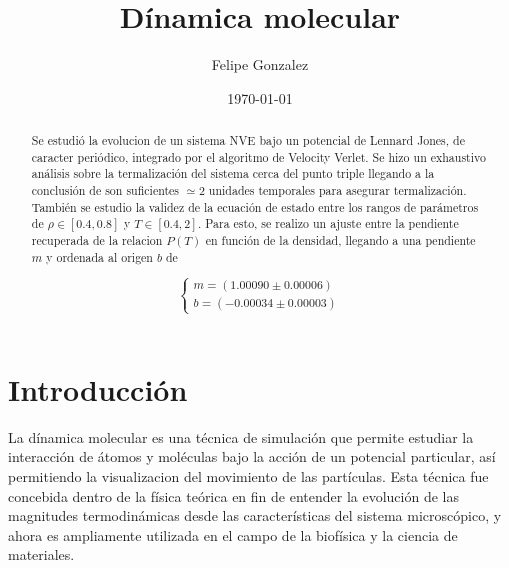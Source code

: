 \documentclass[%
 reprint,
 amsmath,amssymb,
 aps,
]{revtex4-1}
\begin{document}

\title{D\'inamica molecular}

\author{Felipe Gonzalez}


\date{\today}

\begin{abstract}

Se estudi\'o la evolucion de un sistema NVE bajo un potencial de Lennard Jones,
de caracter peri\'odico, integrado por el algoritmo de Velocity Verlet. Se hizo
un exhaustivo an\'alisis sobre la termalizaci\'on del sistema cerca del punto
triple llegando a la conclusi\'on de son suficientes $\simeq 2$ unidades
temporales para asegurar termalizaci\'on. Tambi\'en se estudio la validez de la
ecuaci\'on de estado entre los rangos de par\'ametros de $\rho \in [0.4, 0.8]$
y $T \in [0.4, 2]$. Para esto, se realizo un ajuste entre la pendiente
recuperada de la relacion $P(T)$ en funci\'on de la densidad, llegando a una
pendiente $m$ y ordenada al origen $b$ de

$$
\left \{
  \begin{matrix}
    m = (1.00090 \pm 0.00006) \\
    b = (-0.00034 \pm 0.00003)
  \end{matrix}
\right.
$$

\end{abstract}

\maketitle

\section{Introducci\'on}

La d\'inamica molecular es una t\'ecnica de simulaci\'on que permite estudiar la
interacci\'on de \'atomos y mol\'eculas bajo la acci\'on de un potencial
particular, as\'i permitiendo la visualizacion del movimiento de las
part\'iculas. Esta t\'ecnica fue concebida dentro de la física te\'orica en fin
de entender la evoluci\'on de las magnitudes termodin\'amicas desde las
caracter\'isticas del sistema microsc\'opico, y ahora es ampliamente utilizada
en el campo de la biof\'isica y la ciencia de materiales.
\end{document}
